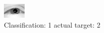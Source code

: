 \begin{figure}[h!]
\begin{center}
\includegraphics[width=0.60\columnwidth]{figures/ID2247_class_1_target_2.png}
\end{center}
\caption{ Classification: 1 actual target: 2}
\label{fig:ID2247_class_1_target_2}
\end{figure}
